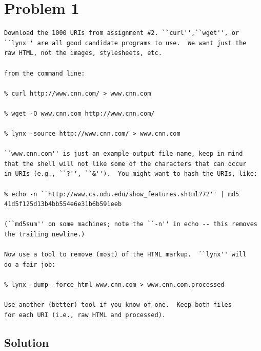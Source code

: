  
\section{Problem 1}
\label{part1}
\begin{verbatim}
Download the 1000 URIs from assignment #2. ``curl'',``wget'', or
``lynx'' are all good candidate programs to use.  We want just the
raw HTML, not the images, stylesheets, etc.

from the command line:

% curl http://www.cnn.com/ > www.cnn.com

% wget -O www.cnn.com http://www.cnn.com/

% lynx -source http://www.cnn.com/ > www.cnn.com

``www.cnn.com'' is just an example output file name, keep in mind
that the shell will not like some of the characters that can occur
in URIs (e.g., ``?'', ``&'').  You might want to hash the URIs, like:

% echo -n ``http://www.cs.odu.edu/show_features.shtml?72'' | md5
41d5f125d13b4bb554e6e31b6b591eeb

(``md5sum'' on some machines; note the ``-n'' in echo -- this removes
the trailing newline.) 

Now use a tool to remove (most) of the HTML markup.  ``lynx'' will
do a fair job:

% lynx -dump -force_html www.cnn.com > www.cnn.com.processed

Use another (better) tool if you know of one.  Keep both files 
for each URI (i.e., raw HTML and processed).
\end{verbatim}

\subsection{Solution}

